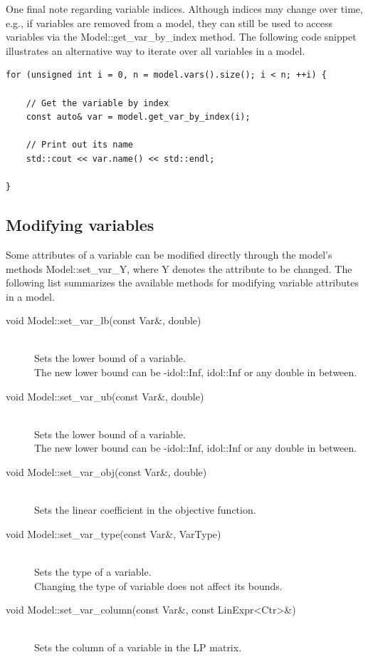 One final note regarding variable indices. Although indices may change over
time, e.g., if variables are removed from a model, they can still be used to
access variables via the \textsf{Model::get\_var\_by\_index} method. The
following code snippet illustrates an alternative way to iterate over all
variables in a model.
%
\begin{lstlisting}
for (unsigned int i = 0, n = model.vars().size(); i < n; ++i) {
    
    // Get the variable by index
    const auto& var = model.get_var_by_index(i);
    
    // Print out its name
    std::cout << var.name() << std::endl;

}
\end{lstlisting}

\subsection{Modifying variables}

Some attributes of a variable can be modified directly through the model's
methods \textsf{Model::set\_var\_Y}, where \textsf{Y} denotes the attribute to
be changed. The following list summarizes the available methods for modifying
variable attributes in a model.
%
\begin{description}
    \item[\textsf{void Model::set\_var\_lb(const Var\&, double)}]\hphantom{.}\\ 
    Sets the lower bound of a variable. \\
    The new lower bound can be \textsf{-idol::Inf}, \textsf{idol::Inf} or any
    double in between. 
    \item[\textsf{void Model::set\_var\_ub(const Var\&, double)}]\hphantom{.}\\ 
    Sets the lower bound of a variable. \\
    The new lower bound can be \textsf{-idol::Inf}, \textsf{idol::Inf} or any
    double in between. 
    \item[\textsf{void Model::set\_var\_obj(const Var\&, double)}]\hphantom{.}\\ 
    Sets the linear coefficient in the objective function. 
    \item[\textsf{void Model::set\_var\_type(const Var\&, VarType)}]\hphantom{.}\\ 
    Sets the type of a variable. \\
    Changing the type of variable does not affect its bounds. 
    \item[\textsf{void Model::set\_var\_column(const Var\&, const LinExpr<Ctr>\&)}]\hphantom{.}\\ 
    Sets the column of a variable in the LP matrix. 
\end{description}

